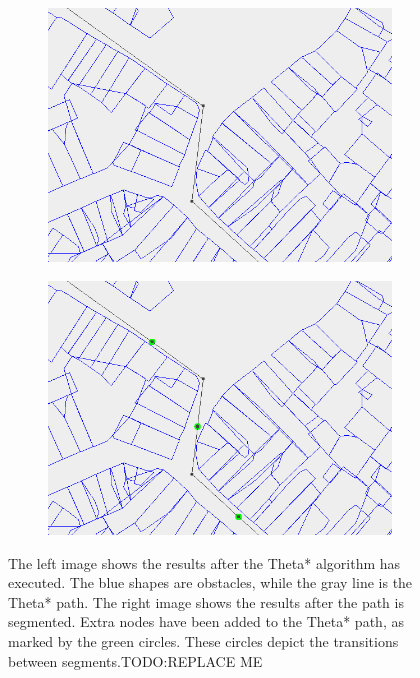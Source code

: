 \begin{figure}[!t]
    \centering
    \begin{subfigure}[t]{0.47\textwidth}
        \includegraphics[width=\textwidth]{img/pre1}
    \end{subfigure}
    \hfil
    \begin{subfigure}[t]{0.47\textwidth}
        \includegraphics[width=\textwidth]{img/pre2}
    \end{subfigure}
    \caption[TODO:REPLACE ME. preprocessing step 1 and 2]{The left image shows the results after the Theta* algorithm has executed. The blue shapes are obstacles, while the gray line is the Theta* path. The right image shows the results after the path is segmented. Extra nodes have been added to the Theta* path, as marked by the green circles. These circles depict the transitions between segments.TODO:REPLACE ME}\label{fig:pre-1-2}
\end{figure}

